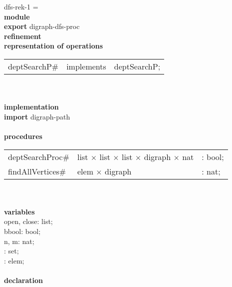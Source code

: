 \begin{tabbing}\label{dfs-rek-1-module}%
dfs-rek-1 = \\
{\bf mod}\={\bf ule}\+\\
{\bf export} digraph-dfs-proc\\
{\bf ref}\={\bf inement}\+\\
{\bf rep}\= {\bf resentation of operations}\+\\
\begin{tabular}{lcl}
deptSearchP\# & implements & deptSearchP;
\end{tabular}\-\\

\\
{\bf implementation}\\
{\bf import} digraph-path\\
\\
{\bf proc}\={\bf edures}\+\\
\begin{tabular}{lll}
deptSearchProc\#& list $\times$ list $\times$ list $\times$ digraph $\times$ nat & : bool;\\
findAllVertices\#& elem $\times$ digraph & : nat;
\end{tabular}\-\\
\\
{\bf vari}\={\bf ables}\+\\
open, close: list;\\
bbool: bool;\\
n, m: nat;\\
: set;\\
: elem;
\-\\
\\

               {\bf declaration}
\end{tabbing}


